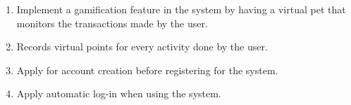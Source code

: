 \begin{comment}
How to formulate your research objectives:
1. Identify what research steps do you need to perform to achieve your general objective.
2. Identify the questions that must be answered for you to achieve your general objective.
    Thereafter, convert these questions into action statements

Example #1:

Research Question:
  What are the general features of a web-based learning environment?

Specific Objective:
   To review existing web-based learning environment that teaches language learning for children


Example #2:

Research Question:
   How will you represent commonsense knowledge for use by computer systems?

Specific Objective:
   To identify knowledge representation approaches used by existing story generation systems

Example #3:
Research Question:
   What types of storytelling knowledge are needed to generate stories?

Specific Objective:
    To identify the different types of storytelling knowledge used in generating stories

Example #4:
Research Question:
    What machine learning approaches will you utilize?

Specific Objective:
    To determine existing machine learning algorithms [that can be used in training the computer system to detect cyberbullying cases] 

Example #5: Research Question:
    How will your research output be evaluated?

Specific Objective:
    To define evaluation metrics for validating the accuracy of the translation

\end{comment}

%
%

\begin{enumerate}
   \item Implement a gamification feature in the system by having a virtual pet that monitors the transactions made by the user.
   \item Records virtual points for every activity done by the user.
   \item Apply for account creation before registering for the system.
   \item Apply automatic log-in when using the system.
\end{enumerate}


